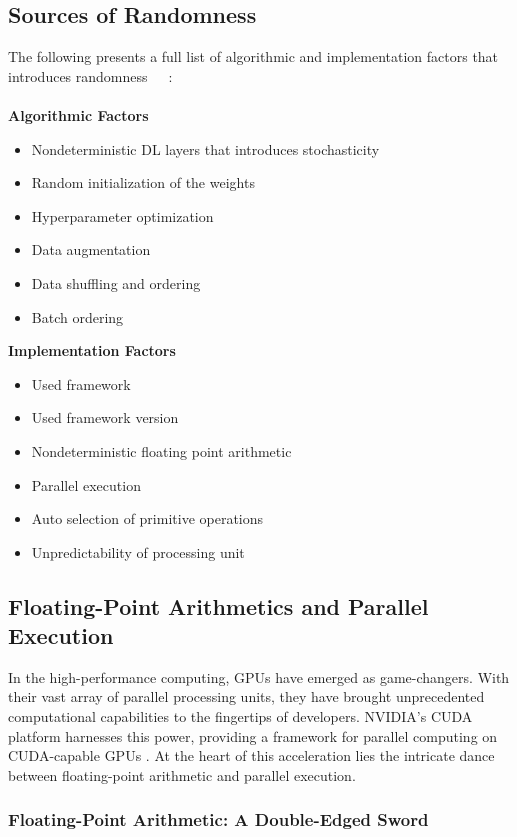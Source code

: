 \subsection{Sources of Randomness}
The following presents a full list of algorithmic and implementation factors that introduces randomness~\cite{pham2020problems}~\cite{gundersen2022sources}~\cite{zhuang2022randomness}:
\\
\\
\textbf{Algorithmic Factors}
\begin{itemize}
    \item Nondeterministic DL layers that introduces stochasticity
    \item Random initialization of the weights
    \item Hyperparameter optimization
    \item Data augmentation
    \item Data shuffling and ordering
    \item Batch ordering
\end{itemize}
\textbf{Implementation Factors}
\begin{itemize}
    \item Used framework
    \item Used framework version
    \item Nondeterministic floating point arithmetic
    \item Parallel execution
    \item Auto selection of primitive operations
    \item Unpredictability of processing unit 
\end{itemize}
\subsection{Floating-Point Arithmetics and Parallel Execution}

In the high-performance computing, GPUs have emerged as game-changers. With their vast array of parallel processing units, they have brought unprecedented computational capabilities to the fingertips of developers. NVIDIA's CUDA platform harnesses this power, providing a framework for parallel computing on CUDA-capable GPUs \cite{chetlur2014cudnn}. At the heart of this acceleration lies the intricate dance between floating-point arithmetic and parallel execution.\\

\subsubsection*{Floating-Point Arithmetic: A Double-Edged Sword}

